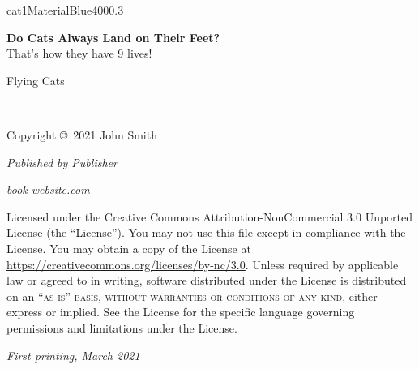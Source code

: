 \documentclass[a4paper,12pt]{book}
\begin{document}
    \begin{simplefrontpage}{cat1}{MaterialBlue400}{0.3}
        \par\normalfont\fontsize{35}{35}\sffamily\selectfont
        \textbf{Do Cats Always Land on Their Feet?}\\
        {\LARGE That's how they have 9 lives!}\par %
        \vspace*{1cm}
        {\Huge Flying Cats}\par %
    \end{simplefrontpage}
    \newpage
    \thispagestyle{empty}
    ~\vfill

    \noindent Copyright \copyright\ 2021 John Smith %

    \noindent \textsl{Published by Publisher} %

    \noindent \textit{book-website.com} %

    \noindent Licensed under the Creative Commons Attribution-NonCommercial 3.0 Unported License
    (the ``License'').
    You may not use this file except in compliance with the License.
    You may obtain a copy of the License at \url{https://creativecommons.org/licenses/by-nc/3.0}.
    Unless required by applicable law or agreed to in writing, software distributed under the
    License is distributed on an \textsc{``as is'' basis, without warranties or conditions of any
    kind}, either express or implied.
    See the License for the specific language governing permissions and limitations under the
    License. %

    \noindent \textit{First printing, March 2021} %

    \pagestyle{empty} %

    \tableofcontents %

    \let\cleardoublepage\clearpage  %


    \pagestyle{fancy} %

    
    \let\cleardoublepage\clearpage

    
    \let\cleardoublepage\clearpage
\end{document}
